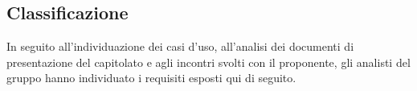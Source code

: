 \subsection{Classificazione}
In seguito all'individuazione dei casi d'uso, all'analisi dei documenti di presentazione del capitolato e agli incontri svolti con il proponente, gli analisti del gruppo \Gruppo{} hanno individuato i requisiti esposti qui di seguito.